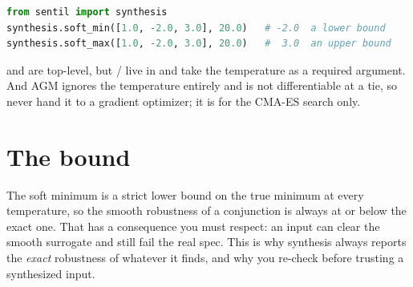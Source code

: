 \begin{lstlisting}[language=Python]
from sentil import synthesis
synthesis.soft_min([1.0, -2.0, 3.0], 20.0)   # -2.0  a lower bound
synthesis.soft_max([1.0, -2.0, 3.0], 20.0)   #  3.0  an upper bound
\end{lstlisting}

\begin{pitfall}
 and  are top-level, but / live in  and take the temperature as a required argument. And AGM ignores the temperature entirely and is not differentiable at a tie, so never hand it to a gradient optimizer; it is for the CMA-ES search only.
\end{pitfall}

\section{The bound}

The soft minimum is a strict lower bound on the true minimum at every temperature, so the smooth robustness of a conjunction is always at or below the exact one. That has a consequence you must respect: an input can clear the smooth surrogate and still fail the real spec. This is why synthesis always reports the \emph{exact} robustness of whatever it finds, and why you re-check  before trusting a synthesized input.